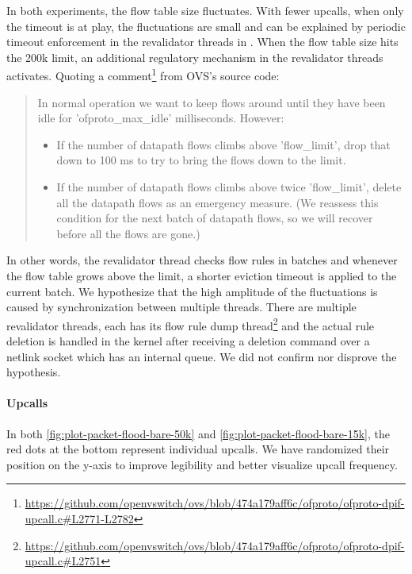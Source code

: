 In both experiments, the flow table size fluctuates. With fewer upcalls, when only the timeout is at play, the fluctuations are small and can be explained by periodic timeout enforcement in the revalidator threads in . When the flow table size hits the 200k limit, an additional regulatory mechanism in the revalidator threads activates. Quoting a comment\footnote{\url{https://github.com/openvswitch/ovs/blob/474a179aff6c/ofproto/ofproto-dpif-upcall.c\#L2771-L2782}} from OVS's source code:

\begin{quote}
    In normal operation we want to keep flows around until they have
    been idle for 'ofproto\_max\_idle' milliseconds.  However:

    \begin{itemize}
        \item If the number of datapath flows climbs above 'flow\_limit', drop that down to 100 ms to try to bring the flows down to the limit.

        \item If the number of datapath flows climbs above twice 'flow\_limit', delete all the datapath flows as an emergency measure.  (We reassess this condition for the next batch of datapath flows, so we will recover before all the flows are gone.)
    \end{itemize}
\end{quote}

In other words, the revalidator thread checks flow rules in batches and whenever the flow table grows above the limit, a shorter eviction timeout is applied to the current batch. We hypothesize that the high amplitude of the fluctuations is caused by synchronization between multiple threads. There are multiple revalidator threads, each has its flow rule dump thread\footnote{\url{https://github.com/openvswitch/ovs/blob/474a179aff6c/ofproto/ofproto-dpif-upcall.c\#L2751}} and the actual rule deletion is handled in the kernel after receiving a deletion command over a netlink socket which has an internal queue. We did not confirm nor disprove the hypothesis.

\paragraph{Upcalls}
In both \cref{fig:plot-packet-flood-bare-50k} and \cref{fig:plot-packet-flood-bare-15k}, the red dots at the bottom represent individual upcalls. We have randomized their position on the y-axis to improve legibility and better visualize upcall frequency.

